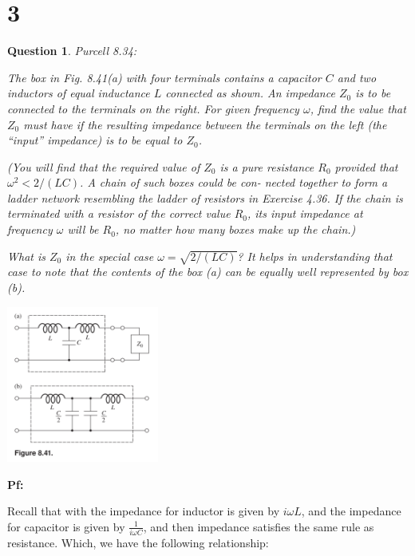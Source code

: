 \documentclass{article}
\newtheorem{question}{Question}
\begin{document}
\section*{3}
\begin{myBox}[]{}
    \begin{question} Purcell 8.34:

        The box in Fig. 8.41(a) with four terminals contains a capacitor
        $C$ and two inductors of equal inductance $L$ connected as shown.
        An impedance $Z_0$ is to be connected to the terminals on the right.
        For given frequency $\omega$, find the value that $Z_0$ must have if the
        resulting impedance between the terminals on the left (the “input”
        impedance) is to be equal to $Z_0$.

        (You will find that the required value of $Z_0$ is a pure resistance
        $R_0$ provided that $\omega^2 < 2/(LC)$. A chain of such boxes could be con-
        nected together to form a ladder network resembling the ladder of
        resistors in Exercise 4.36. If the chain is terminated with a resistor
        of the correct value $R_0$, its input impedance at frequency $\omega$ will be
        $R_0$, no matter how many boxes make up the chain.)

        What is $Z_0$ in the special case $\omega=\sqrt{2/(LC)}$? It helps in understanding
        that case to note that the contents of the box (a) can be
        equally well represented by box (b).

        \begin{center}
            \includegraphics*[width=50mm]{8.34.png}
        \end{center}
    \end{question}
\end{myBox}

\textbf{Pf:}

Recall that with the impedance for inductor is given by $i\omega L$, and the impedance for capacitor is given by $\frac{1}{i\omega C}$,
and then impedance satisfies the same rule as resistance. Which, we have the following relationship:
\end{document}
